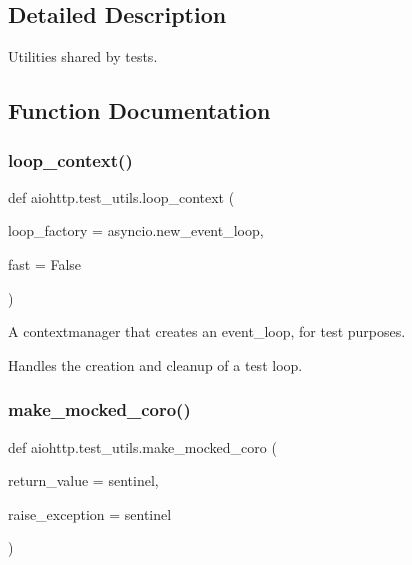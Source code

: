 \subsection{Detailed Description}
\begin{DoxyVerb}Utilities shared by tests.\end{DoxyVerb}
 

\subsection{Function Documentation}
\mbox{\label{namespaceaiohttp_1_1test__utils_ab8e5dd7849cf2738ae5cc90a616e3349}} 
\subsubsection{\texorpdfstring{loop\+\_\+context()}{loop\_context()}}
{\footnotesize\ttfamily def aiohttp.\+test\+\_\+utils.\+loop\+\_\+context (\begin{DoxyParamCaption}\item[{}]{loop\+\_\+factory = {\ttfamily asyncio.new\+\_\+event\+\_\+loop},  }\item[{}]{fast = {\ttfamily False} }\end{DoxyParamCaption})}

\begin{DoxyVerb}A contextmanager that creates an event_loop, for test purposes.

Handles the creation and cleanup of a test loop.
\end{DoxyVerb}
 \mbox{\label{namespaceaiohttp_1_1test__utils_aa94db37a64ab84f56f7190edc72f0f05}} 
\subsubsection{\texorpdfstring{make\+\_\+mocked\+\_\+coro()}{make\_mocked\_coro()}}
{\footnotesize\ttfamily def aiohttp.\+test\+\_\+utils.\+make\+\_\+mocked\+\_\+coro (\begin{DoxyParamCaption}\item[{}]{return\+\_\+value = {\ttfamily sentinel},  }\item[{}]{raise\+\_\+exception = {\ttfamily sentinel} }\end{DoxyParamCaption})}


